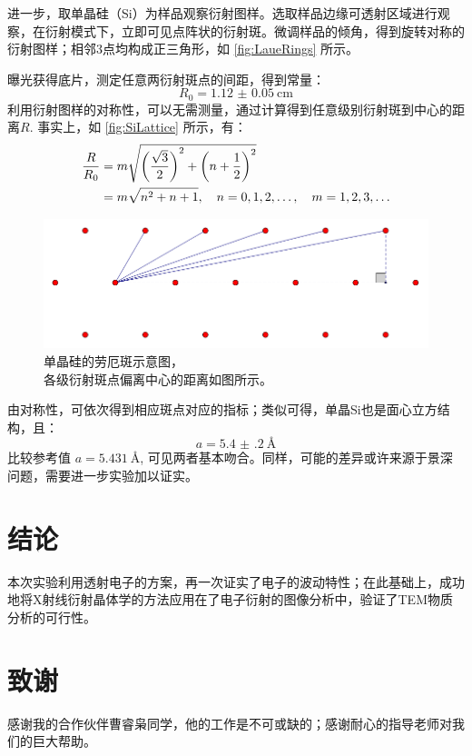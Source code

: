 \documentclass[aps,pre,12pt,preprint,%
	onecolumn,showpacs,showkeys,nofootinbib]{revtex4-1}
\begin{document}
	进一步，取单晶硅（Si）为样品观察衍射图样。选取样品边缘可透射区域进行观察，在衍射模式下，立即可见点阵状的衍射斑。微调样品的倾角，得到旋转对称的衍射图样；相邻3点均构成正三角形，如 \autoref{fig:LaueRings} 所示。
	
	曝光获得底片，测定任意两衍射斑点的间距，得到常量：
	\begin{equation}
		R_0 = \SI{1.12(5)}{\cm}
	\end{equation}
	利用衍射图样的对称性，可以无需测量，通过计算得到任意级别衍射斑到中心的距离$R$. 事实上，如 \autoref{fig:SiLattice} 所示，有：
	\begin{equation}
	\begin{aligned}
		\frac{R}{R_0}
		&= m \sqrt{\pqty{\frac{\sqrt{3}}{2}}^2
			+ \pqty{n + \frac{1}{2}}^2} \\
		&= m \sqrt{n^2 + n + 1},\quad
		n = 0,1,2,\dots,\quad
		m = 1,2,3,\dots
	\end{aligned}
	\end{equation}
	\begin{figure}[!ht]
	\centering
	\includegraphics[width=.6\linewidth]{SiLattice.png}
	\caption{单晶硅的劳厄斑示意图，\\
		各级衍射斑点偏离中心的距离如图所示。}
	\label{fig:SiLattice}
	\end{figure}
\FloatBarrier
	
	由对称性，可依次得到相应斑点对应的指标；类似可得，单晶Si也是面心立方结构，且：
	\begin{equation}
		a = \SI{5.4(2)}{\angstrom}
	\end{equation}
	比较参考值\supercite{CODATAVa61:online} $a = \SI{5.431}{\angstrom}$, 可见两者基本吻合。同样，可能的差异或许来源于景深问题，需要进一步实验加以证实。
\section{结论}
	本次实验利用透射电子的方案，再一次证实了电子的波动特性；在此基础上，成功地将X射线衍射晶体学的方法应用在了电子衍射的图像分析中，验证了TEM物质分析的可行性。
\section{致谢}
	感谢我的合作伙伴曹睿枭同学，他的工作是不可或缺的；感谢耐心的指导老师对我们的巨大帮助。




\clearpage
\end{document}
